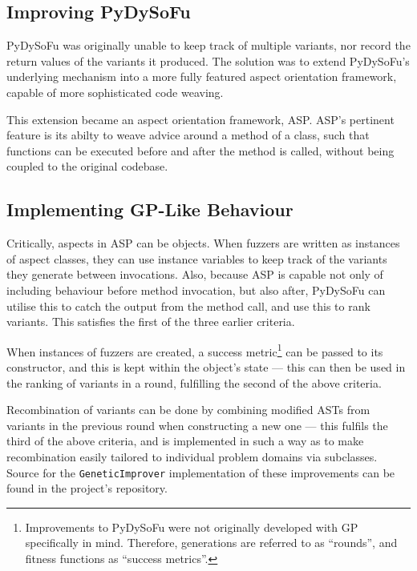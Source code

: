 \documentclass[draft,12pt]{llncs} %
\begin{document}
\subsection{Improving PyDySoFu}
PyDySoFu was originally unable to keep track of multiple variants, nor record
the return values of the variants it produced. The solution was to extend
PyDySoFu's underlying mechanism into a more fully featured aspect orientation
framework, capable of more sophisticated code weaving.\par

This extension became an aspect orientation framework, ASP\cite{asp}. ASP's
pertinent feature is its abilty to weave advice around a method of a class, such
that functions can be executed before and after the method is called, without
being coupled to the original codebase.\par 

\subsection{Implementing GP-Like Behaviour}
Critically, aspects in ASP can be objects. When fuzzers are written as instances
of aspect classes, they can use instance variables to keep track of the variants
they generate between invocations. Also, because ASP is capable not only of
including behaviour before method invocation, but also after, PyDySoFu can
utilise this to catch the output from the method call, and use this to rank
variants. This satisfies the first of the three earlier criteria.\par

When instances of fuzzers are created, a success metric\footnote{Improvements to
  PyDySoFu were not originally developed with GP specifically in mind.
  Therefore, generations are referred to as ``rounds'', and fitness functions as
  ``success metrics''.} can be passed to its constructor, and this is
kept within the object's state --- this can then be used in the ranking of
variants in a round, fulfilling the second of the above criteria.\par

Recombination of variants can be done by combining modified ASTs from variants
in the previous round when constructing a new one --- this fulfils the third of
the above criteria, and is implemented in such a way as to make recombination
easily tailored to individual problem domains via subclasses. Source for the
\texttt{GeneticImprover} implementation of these improvements can be found in
the project's repository\cite{pydysofu}.\par
\end{document}
